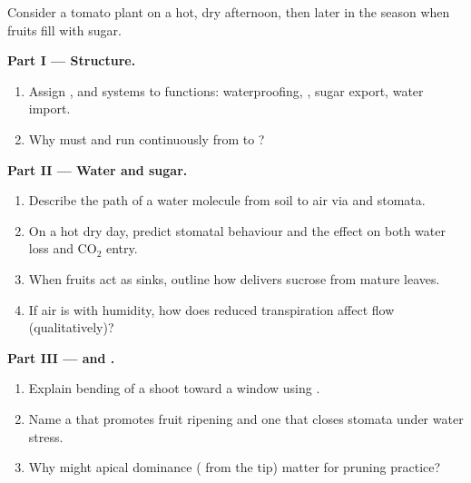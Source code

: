 \begin{problem}
\label{pb:g12:plant-biology:1}
Consider a tomato plant on a hot, dry afternoon, then later in the
season when fruits fill with sugar.

\medskip
\noindent\textbf{Part I --- Structure.}
\begin{enumerate}
  \item Assign ,  and  systems to 
        functions: waterproofing, , sugar export, water
        import.
  \item Why must  and  run continuously from  to ?
\end{enumerate}

\medskip
\noindent\textbf{Part II --- Water and sugar.}
\begin{enumerate}[resume]
  \item Describe the path of a water molecule from soil to air via
         and stomata.
  \item On a hot dry day, predict stomatal behaviour and the effect on
        both water loss and CO$_2$ entry.
  \item When fruits act as sinks, outline how  delivers sucrose
        from mature leaves.
  \item If air is  with humidity, how does reduced
        transpiration affect  flow (qualitatively)?
\end{enumerate}

\medskip
\noindent\textbf{Part III ---  and .}
\begin{enumerate}[resume]
  \item Explain bending of a shoot toward a window using .
  \item Name a  that promotes fruit ripening and one that closes
        stomata under water stress.
  \item Why might apical dominance ( from the tip) matter for
        pruning practice?
\end{enumerate}


\end{problem}
